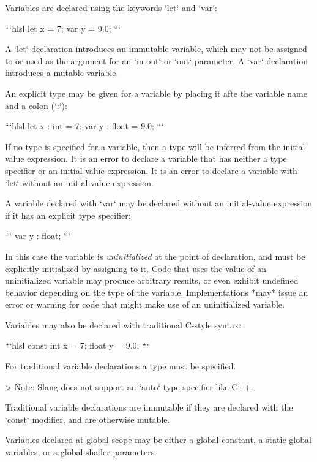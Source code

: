 



Variables are declared using the keywords `let` and `var`:

```hlsl
let x = 7;
var y = 9.0;
```

A `let` declaration introduces an immutable variable, which may not be assigned to or used as the argument for an `in out` or `out` parameter.
A `var` declaration introduces a mutable variable.

An explicit type may be given for a variable by placing it afte the variable name and a colon (`:`):

```hlsl
let x : int = 7;
var y : float = 9.0;
```

If no type is specified for a variable, then a type will be inferred from the initial-value expression.
It is an error to declare a variable that has neither a type specifier or an initial-value expression.
It is an error to declare a variable with `let` without an initial-value expression.

A variable declared with `var` may be declared without an initial-value expression if it has an explicit type specifier:

```
var y : float;
```

In this case the variable is  \emph{uninitialized} at the point of declaration, and must be explicitly initialized by assigning to it.
Code that uses the value of an uninitialized variable may produce arbitrary results, or even exhibit undefined behavior depending on the type of the variable.
Implementations *may* issue an error or warning for code that might make use of an uninitialized variable.


Variables may also be declared with traditional C-style syntax:

```hlsl
const int x = 7;
float y = 9.0;
```

For traditional variable declarations a type must be specified.

> Note: Slang does not support an `auto` type specifier like C++.

Traditional variable declarations are immutable if they are declared with the `const` modifier, and are otherwise mutable.


Variables declared at global scope may be either a global constant, a static global variables, or a global shader parameters.

